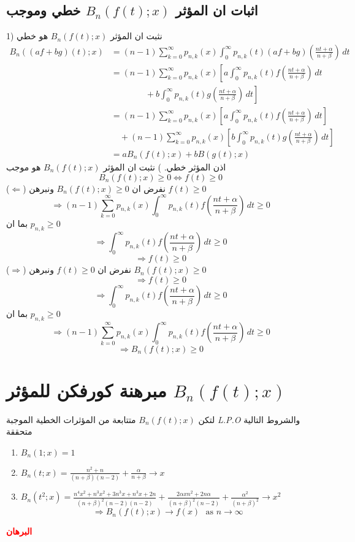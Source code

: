 \subsection*{اثبات ان المؤثر $B_n(f(t); x)$ خطي وموجب}
1) نثبت ان المؤثر $B_n(f(t); x)$ هو خطي
\begin{align*}
	B_n((af+bg)(t); x) &= (n-1)\sum_{k=0}^{\infty} p_{n, k}(x) \int_{0}^{\infty} p_{n, k}(t) (af+bg)\left(\frac{nt + \alpha}{n + \beta}\right) \, dt\\
	&= (n-1)\sum_{k=0}^{\infty} p_{n, k}(x)  \left[a\int_{0}^{\infty} p_{n, k}(t) f\left(\frac{nt + \alpha}{n + \beta}\right) \, dt\right.\\
	&\qquad\qquad  +\left. b\int_{0}^{\infty} p_{n, k}(t) g\left(\frac{nt + \alpha}{n + \beta}\right) \, dt\right]\\
	&= (n-1)\sum_{k=0}^{\infty} p_{n, k}(x)  \left[a\int_{0}^{\infty} p_{n, k}(t) f\left(\frac{nt + \alpha}{n + \beta}\right) \, dt\right]\\
	&\quad + (n-1)\sum_{k=0}^{\infty} p_{n, k}(x)  \left[b\int_{0}^{\infty} p_{n, k}(t) g\left(\frac{nt + \alpha}{n + \beta}\right) \, dt\right]\\
	& = a B_n(f(t) ; x) + b B(g(t); x)
\end{align*}
اذن المؤثر خطي.
\newpage
{}) نثبت ان المؤثر $B_n(f(t); x)$ هو موجب
\[
B_n(f(t); x) \geq 0 \iff f(t) \geq 0
\]
($\Leftarrow$) نفرض ان $B_n(f(t); x) \geq 0$ ونبرهن $f(t) \geq 0$
\[
\Rightarrow (n-1)\sum_{k=0}^{\infty} p_{n, k}(x) \int_{0}^{\infty} p_{n, k}(t) f\left(\frac{nt + \alpha}{n + \beta}\right) \, dt \geq 0 
\] 
بما ان $p_{n, k} \geq 0 $ 
\[
\Rightarrow \int_{0}^{\infty} p_{n, k}(t) f\left(\frac{nt + \alpha}{n + \beta}\right) \, dt \geq 0
\]
\[
\Rightarrow f(t) \geq 0
\]
($\Rightarrow$) نفرض ان $f(t) \geq 0$ ونبرهن $B_n(f(t); x) \geq 0$
\[
\Rightarrow f(t) \geq 0
\]
\[
\Rightarrow \int_{0}^{\infty} p_{n, k}(t) f\left(\frac{nt + \alpha}{n + \beta}\right) \, dt \geq 0
\]
بما ان $p_{n, k} \geq 0 $ 
\[
\Rightarrow (n-1)\sum_{k=0}^{\infty} p_{n, k}(x) \int_{0}^{\infty} p_{n, k}(t) f\left(\frac{nt + \alpha}{n + \beta}\right) \, dt \geq 0 
\] 
\[
\Rightarrow B_n(f(t); x) \geq 0
\]

\newpage
\section{مبرهنة كورفكن للمؤثر $B_n(f(t); x)$}
لتكن $B_n(f(t);x)$ متتابعة من المؤثرات الخطية الموجبة \textit{L.P.O} والشروط التالية متحققة 
\begin{english}
	\begin{enumerate}[label=\arabic*)]
		\item $B_n(1; x) =1$
		\item $B_n(t; x) = \frac{n^2 + n}{(n+ \beta)(n-2)} + \frac{\alpha}{n + \beta} \to x$
		\item $B_n(t^2; x) = \frac{n^4x^2 + n^3x^2 + 3n^3x + n^3 x + 2n}{(n+\beta)^2 (n-2)(n-2)} + \frac{2\alpha x n^2 + 2n \alpha}{(n+\beta)^2 (n-2)} + \frac{\alpha^2 }{(n+\beta)^2} \to x^2$
		\[
		\Rightarrow B_n(f(t); x) \to f(x)\,\, \text{ as $n \to \infty$}
		\]
	\end{enumerate}
\end{english}
\noindent
\textbf{\textcolor{red}{البرهان}}	

